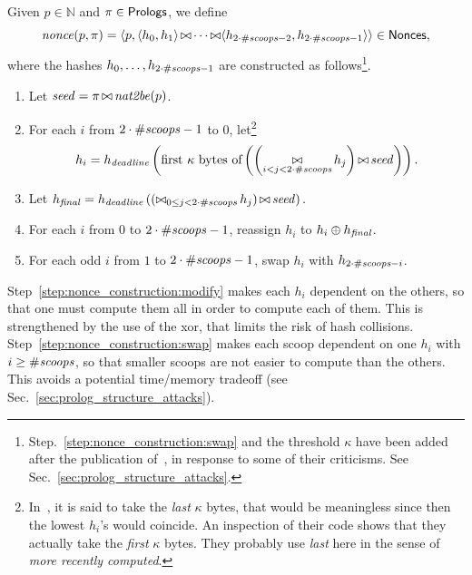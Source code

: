 \begin{alg}[$\nonce(p,\pi)$]\label{alg:nonce_construction}
  Given $p\in\mathbb{N}$ and $\pi\in{\mathsf{Prologs}}$, we define
  \[
  {\mathit{nonce}}(p,\pi)=\langle p,\langle h_0,h_1\rangle\operatorname*{\bowtie}
  \cdots\operatorname*{\bowtie}\langle h_{2\cdot{\#\mathit{scoops}}-2},h_{2\cdot{\#\mathit{scoops}}-1}\rangle\rangle\in{\mathsf{Nonces}},
  \]
  where the hashes $h_0,\ldots,h_{2\cdot{\#\mathit{scoops}}-1}$ are constructed as
  follows\footnote{Step.~\ref{step:nonce_construction:swap} and the threshold $\kappa$
  have been added after the publication of~\cite{ParkKFGAP18},
  in response to some of their criticisms.
  See Sec.~\ref{sec:prolog_structure_attacks}.}.
  \begin{enumerate}
  \item\label{step:nonce_construction:seed} Let ${\mathit{seed}}=\pi\operatorname*{\bowtie}{\mathit{nat2be}}(p)$.
  \item\label{step:nonce_construction:first_hash}
    For each $i$ from $2\cdot{\#\mathit{scoops}}-1$ to $0$,
    let\footnote{In~\cite{SignumPlotting}, it is said to
    take the \emph{last} $\kappa$ bytes, that would be meaningless since then
    the lowest $h_i$'s would coincide. An inspection of their code
    shows that they actually take the \emph{first} $\kappa$ bytes. They
    probably use \emph{last} here in the sense of \emph{more recently computed}.}
    \[
    h_i=h_{\mathit{deadline}}\left(\text{first $\kappa$ bytes of}\left(\left(\operatorname*{\bowtie}_{i<j<2\cdot{\#\mathit{scoops}}}h_j\right)\operatorname*{\bowtie}{\mathit{seed}}\right)\right).
    \]
  \item\label{step:nonce_construction:final_hash}
    Let
    $
    {h_{\mathit{final}}}=h_{\mathit{deadline}}\left(\left(\operatorname*{\bowtie}_{0\le j<2\cdot{\#\mathit{scoops}}}h_j\right)\operatorname*{\bowtie}{\mathit{seed}}\right).
    $
  \item\label{step:nonce_construction:modify} For each $i$ from $0$ to $2\cdot{\#\mathit{scoops}}-1$, reassign
    $h_i$ to $h_i\oplus{h_{\mathit{final}}}$.
  \item\label{step:nonce_construction:swap}
    For each odd $i$ from $1$ to $2\cdot{\#\mathit{scoops}}-1$, swap
    $h_i$ with $h_{2\cdot{\#\mathit{scoops}}-i}$.
  \end{enumerate}
\end{alg}
%
Step~\ref{step:nonce_construction:modify} makes each $h_i$ dependent on the others, so that
one must compute them all in order to compute each of them.
This is strengthened by the use of the xor, that limits the risk of hash collisions.
Step~\ref{step:nonce_construction:swap} makes each scoop dependent on one $h_i$ with $i\ge{\#\mathit{scoops}}$,
so that smaller scoops are not easier to compute than the others. This avoids a potential
time/memory tradeoff (see Sec.~\ref{sec:prolog_structure_attacks}).

